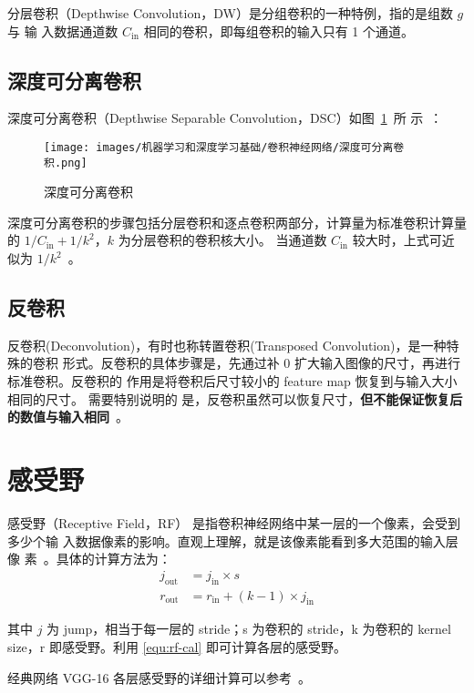 分层卷积（Depthwise Convolution，DW）是分组卷积的一种特例，指的是组数 $g$ 与 输
入数据通道数 $C_{\mathrm{in}}$ 相同的卷积，即每组卷积的输入只有 1 个通道。

\subsection{深度可分离卷积}

深度可分离卷积（Depthwise Separable Convolution，DSC）如图~\ref{fig:ds-conv}~所
示~：

\begin{figure}[ht]
  \centering
  \texttt{[image: images/机器学习和深度学习基础/卷积神经网络/深度可分离卷积.png]}
  \caption{深度可分离卷积}
  \label{fig:ds-conv}
\end{figure}

深度可分离卷积的步骤包括分层卷积和逐点卷积两部分，计算量为标准卷积计算量的 $ 1 /
C_{\mathrm{in}} + 1/k^2 $，$k$ 为分层卷积的卷积核大小。
当通道数 $C_{\mathrm{in}}$ 较大时，上式可近似为 $1 / k^2$~。

\subsection{反卷积}
\label{subsec:deconv}

反卷积(Deconvolution)，有时也称转置卷积(Transposed Convolution)，是一种特殊的卷积
形式。反卷积的具体步骤是，先通过补 0 扩大输入图像的尺寸，再进行标准卷积。反卷积的
作用是将卷积后尺寸较小的 feature map 恢复到与输入大小相同的尺寸。 需要特别说明的
是，反卷积虽然可以恢复尺寸，\textbf{但不能保证恢复后的数值与输入相同}~。

\section{感受野}

感受野（Receptive Field，RF） 是指卷积神经网络中某一层的一个像素，会受到多少个输
入数据像素的影响。直观上理解，就是该像素能看到多大范围的输入层像
素~。具体的计算方法为：
\begin{align}
\label{equ:rf-cal}
j_{\mathrm {out}} & = j_{\mathrm{in}} \times s \\
r_{\mathrm {out}} & = r_{\mathrm{in}} + (k-1) \times j_{\mathrm{in}}
\end{align}

其中 $j$ 为 jump，相当于每一层的 stride；s 为卷积的 stride，k 为卷积的 kernel
size，r 即感受野。利用 \eqref{equ:rf-cal} 即可计算各层的感受野。

经典网络 VGG-16 各层感受野的详细计算可以参考~。

